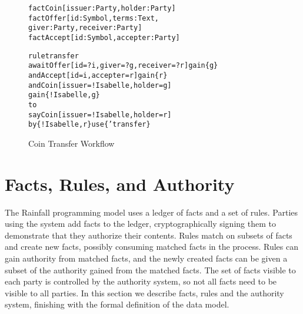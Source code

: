 
\clearpage{}

\begin{figure}
\begin{small}
\begin{alltt}
fact  Coin   [issuer: Party,  holder:   Party]
fact  Offer  [id:     Symbol, terms:    Text,
              giver:  Party,  receiver: Party]
fact  Accept [id:     Symbol, accepter: Party]

rule  transfer
await Offer  [id = ?i, giver = ?g, receiver = ?r] gain \{g\}
  and Accept [id = i,  accepter = r]              gain \{r\}
  and Coin   [issuer = !Isabelle,  holder = g]
      gain \{!Isabelle,g\}
to
  say Coin   [issuer = !Isabelle,  holder = r]
   by \{!Isabelle,r\}  use \{'transfer\}
\end{alltt}
\end{small}
\caption{Coin Transfer Workflow}
\label{f:CoinTransfer}
\end{figure}


\section{Facts, Rules, and Authority}
\label{s:FactsWeights}
The Rainfall programming model uses a ledger of facts and a set of rules. Parties using the system add facts to the ledger, cryptographically signing them to demonstrate that they authorize their contents. Rules match on subsets of facts and create new facts, possibly consuming matched facts in the process. Rules can gain authority from matched facts, and the newly created facts can be given a subset of the authority gained from the matched facts. The set of facts visible to each party is controlled by the authority system, so not all facts need to be visible to all parties. In this section we describe facts, rules and the authority system, finishing with the formal definition of the data model.


